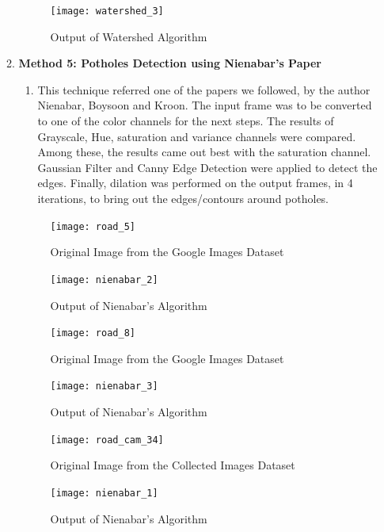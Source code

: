 \begin{enumerate}
\begin{enumerate}
    \begin{figure}[ht!]
        \centering
        \texttt{[image: watershed\_3]}
        \caption{Output of Watershed Algorithm}
    \end{figure}
    \pagebreak
    
    \item \textbf{Method 5: Potholes Detection using Nienabar's Paper}
    \begin{enumerate}
        \item This technique referred one of the papers we followed, by the author Nienabar, Boysoon and Kroon. The input frame was to be converted to one of the color channels for the next steps. The results of Grayscale, Hue, saturation and variance channels were compared. Among these, the results came out best with the saturation channel. Gaussian Filter and Canny Edge Detection were applied to detect the edges. Finally, dilation was performed on the output frames, in 4 iterations, to bring out the edges/contours around potholes.
        
    \end{enumerate}
    \begin{figure}[ht!]
        \centering
        \texttt{[image: road\_5]}
        \caption{Original Image from the Google Images Dataset}
    \end{figure}

    \begin{figure}[ht!]
        \centering
        \texttt{[image: nienabar\_2]}
        \caption{Output of Nienabar's Algorithm}
    \end{figure}
    \pagebreak
    
    \begin{figure}[ht!]
        \centering
        \texttt{[image: road\_8]}
        \caption{Original Image from the Google Images Dataset}
    \end{figure}

    \begin{figure}[ht!]
        \centering
        \texttt{[image: nienabar\_3]}
        \caption{Output of Nienabar's Algorithm}
    \end{figure}
    \pagebreak
    
    \begin{figure}[ht!]
        \centering
        \texttt{[image: road\_cam\_34]}
        \caption{Original Image from the Collected Images Dataset}
    \end{figure}

    \begin{figure}[ht!]
        \centering
        \texttt{[image: nienabar\_1]}
        \caption{Output of Nienabar's Algorithm}
    \end{figure}
    \pagebreak
    

\end{enumerate}
\end{enumerate}
